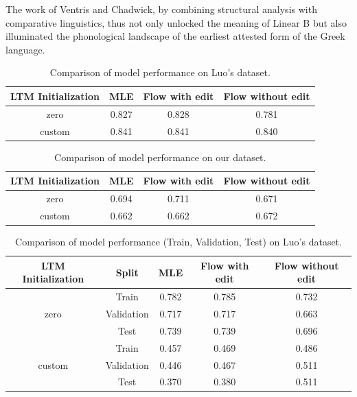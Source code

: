 The work of Ventris and Chadwick, by combining structural analysis with comparative linguistics, thus not only unlocked the meaning of Linear B but also illuminated the phonological landscape of the earliest attested form of the Greek language.

\newpage

\begin{table}[h!]
\centering
\begin{tabular}{|c|c|c|c|}
\hline
\textbf{LTM Initialization} & \textbf{MLE} & \textbf{Flow with edit} & \textbf{Flow without edit} \\
\hline
zero   & 0.827 & 0.828 & 0.781 \\
custom & 0.841 & 0.841 & 0.840 \\
\hline
\end{tabular}
\caption{Comparison of model performance on Luo's dataset.}
\end{table}

\begin{table}[h!]
\centering
\begin{tabular}{|c|c|c|c|}
\hline
\textbf{LTM Initialization} & \textbf{MLE} & \textbf{Flow with edit} & \textbf{Flow without edit} \\
\hline
zero   & 0.694 & 0.711 & 0.671 \\
custom & 0.662 & 0.662 & 0.672 \\
\hline
\end{tabular}
\caption{Comparison of model performance on our dataset.}
\end{table}

\begin{table}[h!]
\centering
\begin{tabular}{|c|c|c|c|c|}
\hline
\textbf{LTM Initialization} & \textbf{Split} & \textbf{MLE} & \textbf{Flow with edit} & \textbf{Flow without edit} \\
\hline
\multirow{3}{*}{zero} 
& Train      & 0.782 & 0.785 & 0.732 \\
& Validation & 0.717 & 0.717 & 0.663 \\
& Test       & 0.739 & 0.739 & 0.696 \\
\hline
\multirow{3}{*}{custom} 
& Train      & 0.457 & 0.469 & 0.486 \\
& Validation & 0.446 & 0.467 & 0.511 \\
& Test       & 0.370 & 0.380 & 0.511 \\
\hline
\end{tabular}
\caption{Comparison of model performance (Train, Validation, Test) on Luo's dataset.}
\end{table}


